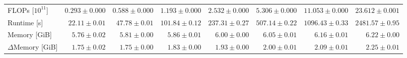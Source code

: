 \begin{tabular}{lrrrrrrr}
\quad FLOPs [$10^{11}$] & $0.293 \pm 0.000$ & $0.588 \pm 0.000$ & $1.193 \pm 0.000$ & $2.532 \pm 0.000$ & $5.306 \pm 0.000$ & $11.053 \pm 0.000$ & $23.612 \pm 0.001$ \\
\quad Runtime [s] & $22.11 \pm 0.01$ & $47.78 \pm 0.01$ & $101.84 \pm 0.12$ & $237.31 \pm 0.27$ & $507.14 \pm 0.22$ & $1096.43 \pm 0.33$ & $2481.57 \pm 0.95$ \\
\quad Memory [GiB] & $5.76 \pm 0.02$ & $5.81 \pm 0.00$ & $5.86 \pm 0.01$ & $6.00 \pm 0.00$ & $6.05 \pm 0.01$ & $6.16 \pm 0.01$ & $6.22 \pm 0.00$ \\
\quad $\Delta$Memory [GiB] & $1.75 \pm 0.02$ & $1.75 \pm 0.00$ & $1.83 \pm 0.00$ & $1.93 \pm 0.00$ & $2.00 \pm 0.01$ & $2.09 \pm 0.01$ & $2.25 \pm 0.01$ \\
\bottomrule
\end{tabular}
